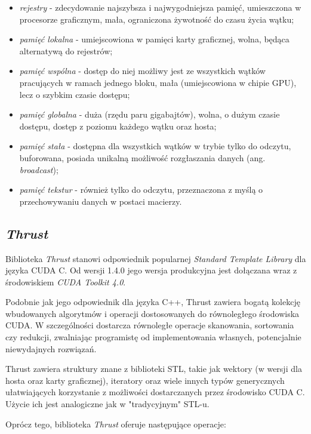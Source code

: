 \documentclass[12pt]{article}
\newcounter{algorytm}
\begin{document}
\begin{itemize}
\item \textit{rejestry} - zdecydowanie najszybsza i najwygodniejsza pamięć, umieszczona w procesorze graficznym, mała, ograniczona żywotność do czasu życia wątku;
\item \textit{pamięć lokalna} - umiejscowiona w pamięci karty graficznej, wolna, będąca alternatywą do rejestrów;
\item \textit{pamięć wspólna} - dostęp do niej możliwy jest ze wszystkich wątków pracujących w ramach jednego bloku, mała (umiejscowiona w chipie GPU), lecz o szybkim czasie dostępu;
\item \textit{pamięć globalna} - duża (rzędu paru gigabajtów), wolna, o dużym czasie dostępu, dostęp z poziomu każdego wątku oraz hosta;
\item \textit{pamięć stała} - dostępna dla wszystkich wątków w trybie tylko do odczytu, buforowana, posiada unikalną możliwość rozgłaszania danych (ang. \textit{broadcast});
\item \textit{pamięć tekstur} - również tylko do odczytu, przeznaczona z myślą o przechowywaniu danych w postaci macierzy.
\end{itemize}

\subsection{\textit{Thrust}}

Biblioteka \textit{Thrust} stanowi odpowiednik popularnej \textit{Standard Template Library} dla języka CUDA C. Od wersji 1.4.0 jego wersja produkcyjna jest dołączana wraz z środowiskiem \textit{CUDA Toolkit 4.0}.

Podobnie jak jego odpowiednik dla języka C++, Thrust zawiera bogatą kolekcję wbudowanych algorytmów i operacji dostosowanych do równoległego środowiska CUDA. W szczególności dostarcza równoległe operacje skanowania, sortowania czy redukcji, zwalniając programistę od implementowania własnych, potencjalnie niewydajnych rozwiązań.

Thrust zawiera struktury znane z biblioteki STL, takie jak wektory (w wersji dla hosta oraz karty graficznej), iteratory oraz wiele innych typów generycznych ułatwiających korzystanie z możliwości dostarczanych przez środowisko CUDA C. Użycie ich jest analogiczne jak w "tradycyjnym" STL-u.

Oprócz tego, biblioteka \textit{Thrust} oferuje następujące operacje:
\end{document}
